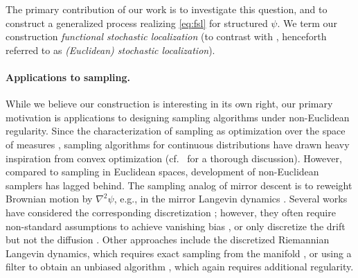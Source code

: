 \documentclass[11pt]{article}
\newcommand{\0}{\mathbf{0}}
\newcommand{\1}{\mathbf{1}}
\begin{document}
The primary contribution of our work is to investigate this question, and to construct a generalized process realizing \eqref{eq:fsl} for structured $\psi$. We term our construction \emph{functional stochastic localization} (to contrast with \cite{Eldan13}, henceforth referred to as \emph{(Euclidean) stochastic localization}). 

\paragraph{Applications to sampling.} While we believe our construction is interesting in its own right, our primary motivation is applications to designing sampling algorithms under non-Euclidean regularity.
Since the characterization of sampling as optimization over the space of measures \cite{JordanKO98}, sampling algorithms for continuous distributions have drawn heavy inspiration from convex optimization \cite{Dalalyan16,Dalalyan17,Wibisono18,Wibisono19,VempalaW19,DurmusMM19,MaCCFBJ21,NitandaWS22} (cf.\ \cite{Chewi23} for a thorough discussion).
However, compared to sampling in Euclidean spaces, development of non-Euclidean samplers has lagged behind. The sampling analog of mirror descent is to reweight Brownian motion by $\nabla^2 \psi$, e.g., in the mirror Langevin dynamics \cite{HsiehKRC18,ChewiLLMRS20}. 
Several works have considered the corresponding discretization \cite{HsiehKRC18,ZhangPFP20,AhnC21,Jiang21,LiTVW22}; however, they often require non-standard assumptions %
to achieve vanishing bias \cite{LiTVW22}, or only discretize the drift but not the diffusion \cite{AhnC21,Jiang21,GuK25}. Other approaches include the discretized Riemannian Langevin dynamics, which requires exact sampling from the manifold \cite{GatmiryV22,LiE23}, or using a filter to obtain an unbiased algorithm \cite{SrinivasanWW24,SrinivasanWW25}, which again requires additional regularity.
\end{document}
